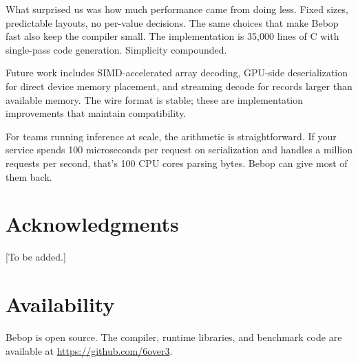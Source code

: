 \documentclass[11pt,onecolumn]{article}
\begin{document}
What surprised us was how much performance came from doing less. Fixed sizes, predictable layouts, no per-value decisions. The same choices that make Bebop fast also keep the compiler small. The implementation is 35,000 lines of C with single-pass code generation. Simplicity compounded.

Future work includes SIMD-accelerated array decoding, GPU-side deserialization for direct device memory placement, and streaming decode for records larger than available memory. The wire format is stable; these are implementation improvements that maintain compatibility.

For teams running inference at scale, the arithmetic is straightforward. If your service spends 100 microseconds per request on serialization and handles a million requests per second, that's 100 CPU cores parsing bytes. Bebop can give most of them back.

\section*{Acknowledgments}

[To be added.]

\section*{Availability}

Bebop is open source. The compiler, runtime libraries, and benchmark code are available at \url{https://github.com/6over3}.


\newpage
\end{document}
